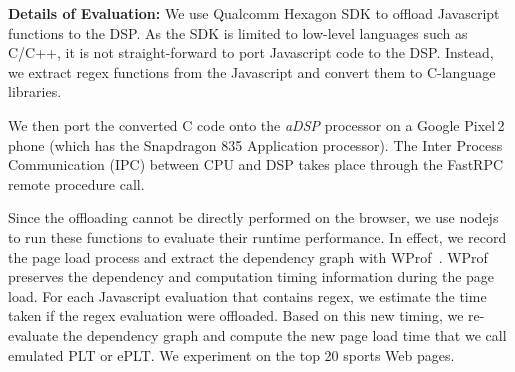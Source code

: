 

\noindent\textbf{Details of Evaluation:}
We use Qualcomm Hexagon SDK \cite{hexqual2013qcom} to offload Javascript functions to the DSP.
As the SDK is limited to low-level languages such as C/C++, it is not straight-forward to port Javascript code to the DSP.
Instead, we extract regex functions from the Javascript
and convert them to C-language libraries. %

We then port the converted C code onto the \textit{aDSP} processor on a Google Pixel\,2 phone
(which has the Snapdragon 835 Application processor). 
The Inter Process Communication (IPC) between CPU and DSP takes place through 
the FastRPC remote procedure call.

Since the offloading cannot be directly performed on the browser, we use nodejs to run these functions to evaluate their runtime performance. In effect, we record the page load process and extract the dependency graph with WProf~\cite{wang2013demystifying}. WProf preserves the dependency and computation timing information during the page load. For each Javascript evaluation that contains regex, we estimate the time taken if the regex evaluation were offloaded. Based on this new timing, we re-evaluate the dependency graph and compute the new page load time that we call emulated PLT or ePLT. We experiment on the top 20 sports Web pages.

